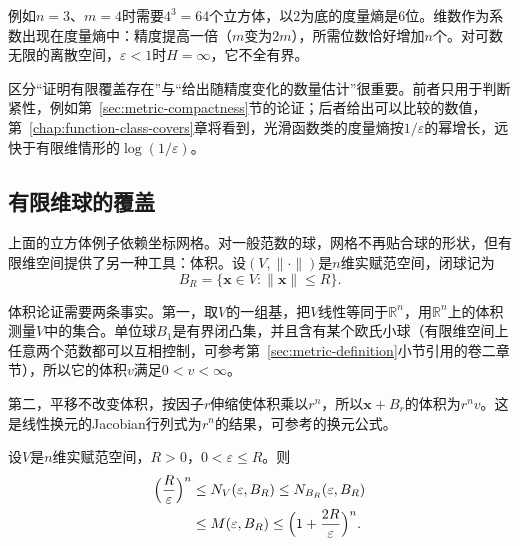 例如$n=3$、$m=4$时需要$4^3=64$个立方体，以$2$为底的度量熵是$6$位。维数作为系数出现在度量熵中：精度提高一倍（$m$变为$2m$），所需位数恰好增加$n$个。对可数无限的离散空间，$\varepsilon<1$时$H=\infty$，它不全有界。

区分“证明有限覆盖存在”与“给出随精度变化的数量估计”很重要。前者只用于判断紧性，例如第~\ref{sec:metric-compactness}节的论证；后者给出可以比较的数值，第~\ref{chap:function-class-covers}章将看到，光滑函数类的度量熵按$1/\varepsilon$的幂增长，远快于有限维情形的$\log(1/\varepsilon)$。

\subsection{有限维球的覆盖}
\label{sec:metric-finite-dim-ball}

上面的立方体例子依赖坐标网格。对一般范数的球，网格不再贴合球的形状，但有限维空间提供了另一种工具：体积。设$(V,\lVert\cdot\rVert)$是$n$维实赋范空间，闭球记为
\[
B_R=\{\bm x\in V:\lVert\bm x\rVert\leq R\}.
\]

体积论证需要两条事实。第一，取$V$的一组基，把$V$线性等同于$\mathbb R^n$，用$\mathbb R^n$上的体积测量$V$中的集合。单位球$B_1$是有界闭凸集，并且含有某个欧氏小球（有限维空间上任意两个范数都可以互相控制，可参考第~\ref{sec:metric-definition}小节引用的卷二章节），所以它的体积$v$满足$0<v<\infty$。

第二，平移不改变体积，按因子$r$伸缩使体积乘以$r^n$，所以$\bm x+B_r$的体积为$r^nv$。这是线性换元的Jacobian行列式为$r^n$的结果，可参考的换元公式。

\begin{theorem}[有限维球的覆盖数]
\label{thm:metric-finite-dim-ball-cover}
设$V$是$n$维实赋范空间，$R>0$，$0<\varepsilon\leq R$。则
\begin{equation}
\begin{aligned}
\Bigl(\frac R\varepsilon\Bigr)^n&\leq N_V(\varepsilon,B_R)\leq N_{B_R}(\varepsilon,B_R)\\
&\leq M(\varepsilon,B_R)\leq\Bigl(1+\frac{2R}\varepsilon\Bigr)^n.
\end{aligned}
\label{eq:metric-finite-dim-ball-cover}
\end{equation}
\end{theorem}

